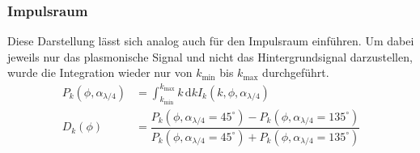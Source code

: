 \documentclass[a4paper, titlepage,  ngerman, fullpage]{book}
\begin{document}
		\subsubsection{Impulsraum}
		Diese Darstellung lässt sich analog auch für den Impulsraum einführen. Um dabei jeweils nur das plasmonische Signal und nicht das Hintergrundsignal darzustellen, wurde die Integration wieder nur von  $k_\mathrm{min}$ bis $k_\mathrm{max}$ durchgeführt.
		\begin{align}
			P_k(\phi, \alpha_{\lambda/4}) &= \int_{k_\mathrm{min}}^{k_\mathrm{max}}k\,\mathrm{d}k I_k(k, \phi, \alpha_{\lambda /4}) \\
			D_k(\phi) &= \dfrac{P_k(\phi, \alpha_{\lambda/4} = 45^\circ) - P_k(\phi, \alpha_{\lambda/4} = 135^\circ)}{P_k(\phi, \alpha_{\lambda/4} = 45^\circ) + P_k(\phi, \alpha_{\lambda/4} = 135^\circ)}
		\end{align}
\end{document}
